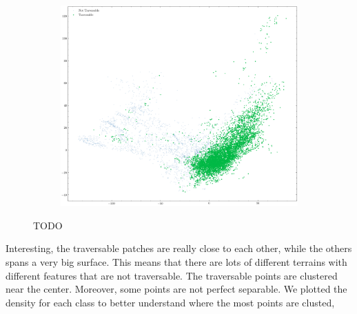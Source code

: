 \documentclass[../document.tex]{subfiles}
\begin{document}
\begin{figure}[H]
\begin{subfigure}[b]{0.48\textwidth}
    \end{subfigure}
    \begin{subfigure}[b]{0.48\textwidth}
        \includegraphics[width=\linewidth]{../img/5/pca/pca-test-1.png}
    \end{subfigure}
\caption{TODO}
\end{figure}
Interesting, the traversable patches are really close to each other, while the others spans a very big surface. This means that there are lots of different terrains with different features that are not traversable. The traversable points are clustered near the center. Moreover, some points are not perfect separable. We plotted the density for each class to better understand where the most points are clusted,
\end{document}
